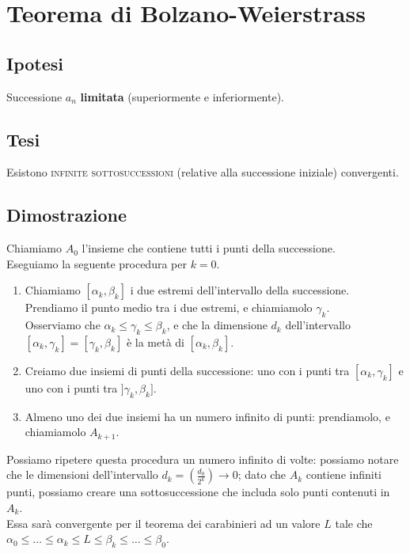 \documentclass{article}
\begin{document}
\section{Teorema di Bolzano-Weierstrass}

\begin{multicols}{2}
    \subsection{Ipotesi}
    Successione \(a_n\) \textbf{limitata} (superiormente e inferiormente).
\columnbreak
    \subsection{Tesi}
    Esistono \textsc{infinite sottosuccessioni} (relative alla successione iniziale) convergenti.
\end{multicols}

\subsection{Dimostrazione}

Chiamiamo \(A_0\) l'insieme che contiene tutti i punti della successione.\\
Eseguiamo la seguente procedura per \(k = 0\).
\begin{enumerate}
    \item Chiamiamo \([\alpha_k, \beta_k]\) i due estremi dell'intervallo della successione.\\
          Prendiamo il punto medio tra i due estremi, e chiamiamolo \(\gamma_k\).\\
          Osserviamo che \(\alpha_k \leq \gamma_k \leq \beta_k\), e che la dimensione \(d_k\) dell'intervallo \([\alpha_k, \gamma_k] = [\gamma_k, \beta_k]\) è la metà di \([\alpha_k, \beta_k]\).
    \item Creiamo due insiemi di punti della successione: uno con i punti tra \([\alpha_k, \gamma_k]\) e uno con i punti tra \(]\gamma_k, \beta_k]\).
    \item Almeno uno dei due insiemi ha un numero infinito di punti: prendiamolo, e chiamiamolo \(A_{k+1}\).
\end{enumerate}
Possiamo ripetere questa procedura un numero infinito di volte: possiamo notare che le dimensioni dell'intervallo \(d_k = (\frac{d_0}{2^k}) \to 0\); dato che \(A_k\) contiene infiniti punti, possiamo creare una sottosuccessione che includa solo punti contenuti in \(A_k\).\\
Essa sarà convergente per il teorema dei carabinieri ad un valore \(L\) tale che \(\alpha_0 \leq \dots \leq \alpha_k \leq L \leq \beta_k \leq \dots \leq \beta_0\).
\end{document}
